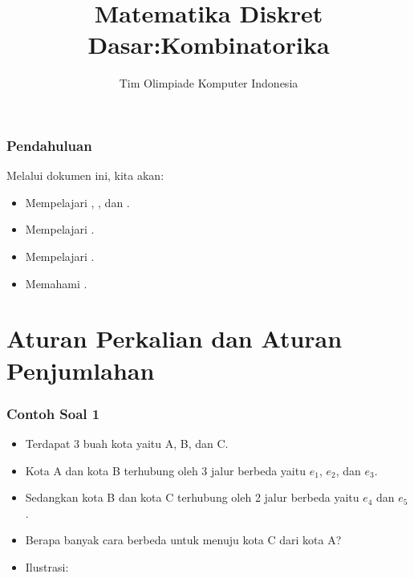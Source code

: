 
\usepackage{tikz}

\title{Matematika Diskret Dasar:\newline Kombinatorika}
\author{Tim Olimpiade Komputer Indonesia}
\date{}



\begin{frame}
\titlepage
\end{frame}

\begin{frame}
\frametitle{Pendahuluan}
Melalui dokumen ini, kita akan:
\begin{itemize}
  \item Mempelajari , , dan .
  \item Mempelajari .
  \item Mempelajari .
  \item Memahami .
\end{itemize}
\end{frame}

\section{Aturan Perkalian dan Aturan Penjumlahan}
\frame{\sectionpage}

\begin{frame}
\frametitle{Contoh Soal 1}
\begin{itemize}
  \item Terdapat 3 buah kota yaitu A, B, dan C.
  \item Kota A dan kota B terhubung oleh 3 jalur berbeda yaitu $e_{1}$, $e_{2}$, dan $e_{3}$.
  \item Sedangkan kota B dan kota C terhubung oleh 2 jalur berbeda yaitu $e_{4}$ dan $e_{5}$.
  \item Berapa banyak cara berbeda untuk menuju kota C dari kota A?
  \item Ilustrasi: 
  \newline
\end{itemize}
\end{frame}

